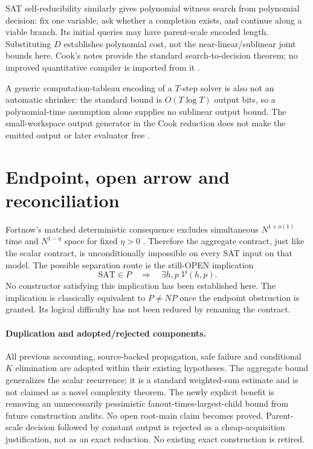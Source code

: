 \documentclass[11pt]{article}
\begin{document}
SAT self-reducibility similarly gives polynomial witness search from
polynomial decision: fix one variable, ask whether a completion exists,
and continue along a viable branch. Its initial queries may have
parent-scale encoded length. Substituting $D$ establishes polynomial
cost, not the near-linear/sublinear joint bounds here. Cook's notes
provide the standard search-to-decision theorem; no improved quantitative
compiler is imported from it \cite{cooksearch}.

A generic computation-tableau encoding of a $T$-step solver is also not
an automatic shrinker: the standard bound is $O(T\log T)$ output bits,
so a polynomial-time assumption alone supplies no sublinear output bound.
The small-workspace output generator in the Cook reduction does not make
the emitted output or later evaluator free \cite{fortnow}.

\section{Endpoint, open arrow and reconciliation}
Fortnow's matched deterministic consequence excludes simultaneous
$N^{1+o(1)}$ time and $N^{1-\eta}$ space for fixed $\eta>0$
\cite{fortnow}. Therefore the aggregate contract, just like the scalar
contract, is unconditionally impossible on every SAT input on that model.
The possible separation route is the still-OPEN implication
\[
 \mathrm{SAT}\in P\quad\Longrightarrow\quad
 \exists h,p\;\mathcal V(h,p).
\]
No constructor satisfying this implication has been established here.
The implication is classically equivalent to $P\ne NP$ once the endpoint
obstruction is granted. Its logical difficulty has not been reduced by
renaming the contract.

\paragraph{Duplication and adopted/rejected components.}
All previous accounting, source-backed propagation, safe failure and
conditional $K$ elimination are adopted within their existing hypotheses.
The aggregate bound generalizes the scalar recurrence; it is a standard
weighted-sum estimate and is not claimed as a novel complexity theorem.
The newly explicit benefit is removing an unnecessarily pessimistic
fanout-times-largest-child bound from future construction audits.
No open root-main claim becomes proved. Parent-scale decision followed
by constant output is rejected as a cheap-acquisition justification,
not as an exact reduction. No existing exact construction is retired.
\end{document}
